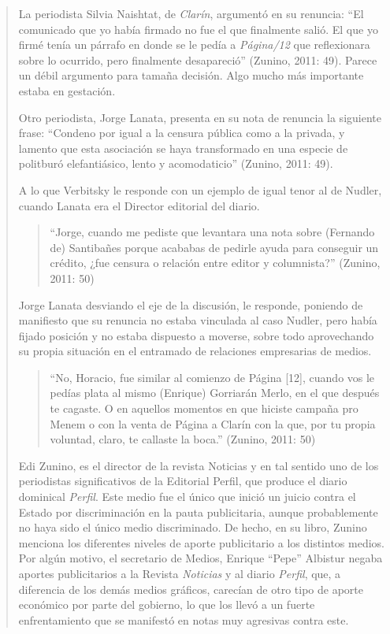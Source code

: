 \begin{quote}
La periodista Silvia Naishtat, de \emph{Clarín}, argumentó en su renuncia: \enquote{El comunicado que yo había firmado no fue el que finalmente salió. El que yo firmé tenía un párrafo en donde se le pedía a \emph{Página/12 }que reflexionara sobre lo ocurrido, pero finalmente desapareció} (Zunino, 2011: 49). Parece un débil argumento para tamaña decisión. Algo mucho más importante estaba en gestación.

Otro periodista, Jorge Lanata, presenta en su nota de renuncia la siguiente frase: \enquote{Condeno por igual a la censura pública como a la privada, y lamento que esta asociación se haya transformado en una especie de politburó elefantiásico, lento y acomodaticio} (Zunino, 2011: 49).

A lo que Verbitsky le responde con un ejemplo de igual tenor al de Nudler, cuando Lanata era el Director editorial del diario.

\begin{quote}
	\enquote{Jorge, cuando me pediste que levantara una nota sobre (Fernando de) Santibañes porque acababas de pedirle ayuda para conseguir un crédito, ¿fue censura o relación entre editor y columnista?} (Zunino, 2011: 50)
\end{quote}


Jorge Lanata desviando el eje de la discusión, le responde, poniendo de manifiesto que su renuncia no estaba vinculada al caso Nudler, pero había fijado posición y no estaba dispuesto a moverse, sobre todo aprovechando su propia situación en el entramado de relaciones empresarias de medios.

\begin{quote}
	\enquote{No, Horacio, fue similar al comienzo de Página {[}12{]}, cuando vos le pedías plata al mismo (Enrique) Gorriarán Merlo, en el que después te cagaste. O en aquellos momentos en que hiciste campaña pro Menem o con la venta de Página a Clarín con la que, por tu propia voluntad, claro, te callaste la boca.} (Zunino, 2011: 50)
\end{quote}


Edi Zunino, es el director de la revista Noticias y en tal sentido uno de los periodistas significativos de la Editorial Perfil, que produce el diario dominical \emph{Perfil}. Este medio fue el único que inició un juicio contra el Estado por discriminación en la pauta publicitaria, aunque probablemente no haya sido el único medio discriminado. De hecho, en su libro, Zunino menciona los diferentes niveles de aporte publicitario a los distintos medios. Por algún motivo, el secretario de Medios, Enrique ``Pepe'' Albistur negaba aportes publicitarios a la Revista \emph{Noticias} y al diario \emph{Perfil}, que, a diferencia de los demás medios gráficos, carecían de otro tipo de aporte económico por parte del gobierno, lo que los llevó a un fuerte enfrentamiento que se manifestó en notas muy agresivas contra este.


\end{quote}
